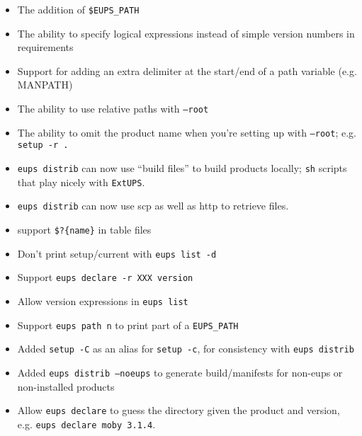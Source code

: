 \documentclass{article}
\newcommand{\code}[1]{\texttt{#1}}
\newcommand{\eups}{\code{ExtUPS}}
\begin{document}
\begin{itemize}
  \item
    The addition of \code{\$EUPS\_PATH}

  \item
    The ability to specify logical expressions instead
    of simple version numbers in requirements

  \item
    Support for adding an extra delimiter at the
    start/end of a path variable (e.g. MANPATH)

  \item
    The ability to use relative paths with \code{--root}

  \item
    The ability to omit the product name when you're
    setting up with \code{--root}; e.g. \code{setup -r .}

  \item
    \code{eups distrib} can now use ``build files'' to
    build products locally; \code{sh} scripts that
    play nicely with \eups{}.

  \item
    \code{eups distrib} can now use scp as well as http to
    retrieve files.

  \item
    support \code{\$?\{name\}} in table files

  \item
    Don't print setup/current with \code{eups list -d}


  \item
    Support \code{eups declare -r XXX version}

  \item
    Allow version expressions in \code{eups list}

  \item
    Support \code{eups path n} to print part of a \code{EUPS\_PATH}

  \item
    Added \code{setup -C} as an alias for \code{setup -c}, for consistency with \code{eups distrib}

  \item
    Added \code{eups distrib --noeups} to generate build/manifests for non-eups or non-installed products

  \item
    Allow \code{eups declare} to guess the directory given the product and version,
    e.g. \code{eups declare moby 3.1.4}.


\end{itemize}
\end{document}
